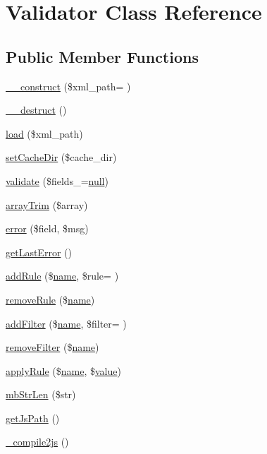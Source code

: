 \hypertarget{classValidator}{}\section{Validator Class Reference}
\label{classValidator}
\subsection*{Public Member Functions}
\begin{DoxyCompactItemize}
\item 
\hyperlink{classValidator_abfd7a6c58dc8cedae5bef76325b7bf6e}{\+\_\+\+\_\+construct} (\$xml\+\_\+path= \textquotesingle{}\textquotesingle{})
\item 
\hyperlink{classValidator_aa076d09e847e8461281d4912688a9388}{\+\_\+\+\_\+destruct} ()
\item 
\hyperlink{classValidator_a43de0eb69cae01eee855f825324ffc39}{load} (\$xml\+\_\+path)
\item 
\hyperlink{classValidator_a1630131530dca60428e72dd4dd2d4af3}{set\+Cache\+Dir} (\$cache\+\_\+dir)
\item 
\hyperlink{classValidator_a05e34dac507b8d719e7f95f2cd0220bc}{validate} (\$fields\+\_\+=\hyperlink{modernizr_8min_8js_a286f9ec831c5e676eeb493248eab9575}{null})
\item 
\hyperlink{classValidator_ac4be365554a620a921f6846e80d76671}{array\+Trim} (\$array)
\item 
\hyperlink{classValidator_ad46fa003b320d64ef656b22de870782c}{error} (\$field, \$msg)
\item 
\hyperlink{classValidator_a3de1a1112e46b42ab6a89a4a13048504}{get\+Last\+Error} ()
\item 
\hyperlink{classValidator_a71cc158b6b3f52f03e1ddb34f4801906}{add\+Rule} (\$\hyperlink{common_8js_a22c29d2aa8ed6161ce8faa718ef76e68}{name}, \$rule= \textquotesingle{}\textquotesingle{})
\item 
\hyperlink{classValidator_acc2d2fd527f54e1fed839a927a83c6b8}{remove\+Rule} (\$\hyperlink{common_8js_a22c29d2aa8ed6161ce8faa718ef76e68}{name})
\item 
\hyperlink{classValidator_a5f22a8ddf58df13376769ed422492e33}{add\+Filter} (\$\hyperlink{common_8js_a22c29d2aa8ed6161ce8faa718ef76e68}{name}, \$filter= \textquotesingle{}\textquotesingle{})
\item 
\hyperlink{classValidator_a7613a0d6b468b5d5ade046a801b260db}{remove\+Filter} (\$\hyperlink{common_8js_a22c29d2aa8ed6161ce8faa718ef76e68}{name})
\item 
\hyperlink{classValidator_a8a8be8c74216e9d0ebbd99eb1e29b8d2}{apply\+Rule} (\$\hyperlink{common_8js_a22c29d2aa8ed6161ce8faa718ef76e68}{name}, \$\hyperlink{jquery_8js_abe5393d870043cf6aaa1d5ad5fce755c}{value})
\item 
\hyperlink{classValidator_a46de77869676b1b027a076c2106653e2}{mb\+Str\+Len} (\$str)
\item 
\hyperlink{classValidator_ae9037d1911390583a1358b25c03768e3}{get\+Js\+Path} ()
\item 
\hyperlink{classValidator_ae7b44a7a2bfb3ee4672b4cf2cdbd059f}{\+\_\+compile2js} ()
\end{DoxyCompactItemize}
